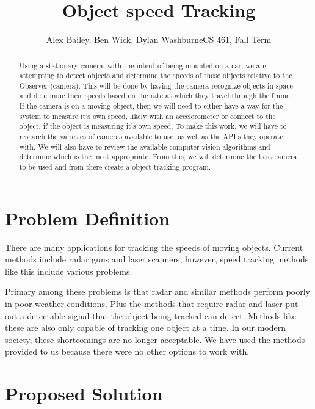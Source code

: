 \documentclass[letterpaper,10pt,onecolumn,draftclsnofoot]{IEEEtran}
\title{Object speed Tracking}
\author{Alex Bailey, Ben Wick, Dylan WashburneCS 461, Fall Term}
\begin{document}
\begin{titlepage}

\maketitle

\begin{abstract}
Using a stationary camera, with the intent of being mounted on a car, we are attempting to  detect objects and determine the speeds of those objects relative to the Observer (camera).
This will be done by having the camera recognize objects in space and determine their speeds based on the rate at which they travel through the frame.
If the camera is on a moving object, then we will need to either have a way for the system to measure it's own speed, likely with an accelerometer or connect to the object, if the object is measuring it's own speed.
To make this work, we will have to research the varieties of cameras available to use, as well as the API’s  they operate with.
We will also have to review the available computer vision algorithms and determine which is the most appropriate.
From this, we will determine the best camera to be used and from there create a object tracking program.
 
\end{abstract}

\end{titlepage}

\section{Problem Definition}

There are many applications for tracking the speeds of moving objects.
 Current methods include radar guns and laser scanners, however, speed tracking methods like this include various problems.

 Primary among these problems is that radar and similar methods perform poorly in poor weather conditions.
 Plus the methods that require radar and laser put out a detectable signal that the object being tracked can detect.
  Methods like these are also only capable of tracking one object at a time.
 In our modern society, these shortcomings are no longer acceptable.
 We have used the methods provided to us because there were no other options to work with.



\section{Proposed Solution}
\end{document}
